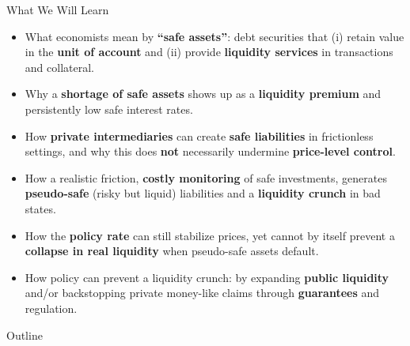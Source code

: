 \documentclass[11pt,aspectratio=169]{beamer}
\begin{document}
\begin{frame}{What We Will Learn}
\small
\begin{itemize}
  \item What economists mean by \textbf{``safe assets''}: debt securities that (i) retain value in the \textbf{unit of account} and (ii) provide \textbf{liquidity services} in transactions and collateral.

  \item Why a \textbf{shortage of safe assets} shows up as a \textbf{liquidity premium} and persistently low safe interest rates.

  \item How \textbf{private intermediaries} can create \textbf{safe liabilities} in frictionless settings, and why this does \textbf{not} necessarily undermine \textbf{price-level control}.

  \item How a realistic friction, \textbf{costly monitoring} of safe investments, generates \textbf{pseudo-safe} (risky but liquid) liabilities and a \textbf{liquidity crunch} in bad states.

  \item How the \textbf{policy rate} can still stabilize prices, yet cannot by itself prevent a \textbf{collapse in real liquidity} when pseudo-safe assets default.

    \item How policy can prevent a liquidity crunch: by expanding \textbf{public liquidity} and/or backstopping private money-like claims
    through \textbf{guarantees} and regulation.

\end{itemize}
\end{frame}

\begin{frame}{Outline}
\tableofcontents
\end{frame}

\end{document}

